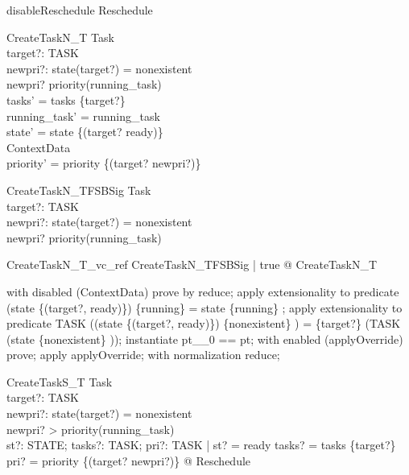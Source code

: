 \documentclass[a4paper, 12pt]{article}
\begin{document}
\begin{zed}
disableReschedule  \land  Reschedule
\end{zed}

\begin{schema}{CreateTaskN\_T}
  \Delta Task\\
  target?: TASK\\
  newpri?: \nat 
\where
  state(target?) = nonexistent\\
  newpri? \leq  priority(running\_task)\\
  tasks' = tasks \cup  \{target?\}\\
  running\_task' = running\_task\\
  state' = state \oplus  \{(target? \mapsto  ready)\}\\
  \Xi ContextData\\
  priority' = priority \oplus  \{(target? \mapsto  newpri?)\}
\end{schema}

\begin{schema}{CreateTaskN\_TFSBSig}
  Task\\
  target?: TASK \\
  newpri?: \nat
\where
  state(target?) = nonexistent\\
  newpri? \leq  priority(running\_task)
\end{schema}

\begin{theorem}{CreateTaskN\_T\_vc\_ref}
\forall  CreateTaskN\_TFSBSig | true @ \pre  CreateTaskN\_T
\end{theorem}

\begin{zproof}
with disabled (ContextData) prove by reduce;
apply extensionality to predicate (state \oplus  \{(target?, ready)\}) \inv  \limg  \{running\} \rimg  = state \inv  \limg  \{running\} \rimg ;
apply extensionality to predicate TASK \setminus  ((state \oplus  \{(target?, ready)\}) \inv  \limg  \{nonexistent\} \rimg ) = \{target?\} \cup  (TASK \setminus  (state \inv  \limg  \{nonexistent\} \rimg ));
instantiate pt\_\_0 == pt;
with enabled (applyOverride) prove;
apply applyOverride;
with normalization reduce;
\end{zproof}

\begin{schema}{CreateTaskS\_T}
  \Delta Task\\
  target?: TASK\\
  newpri?: \nat 
\where
  state(target?) = nonexistent\\
  newpri? > priority(running\_task)\\
  \exists  st?: STATE; tasks?: \power  TASK; pri?: TASK \fun  \nat  | st? = ready \land  tasks? = tasks \cup  \{target?\} \land  pri? = priority \oplus  \{(target? \mapsto  newpri?)\} @ Reschedule
\end{schema}
\end{document}
